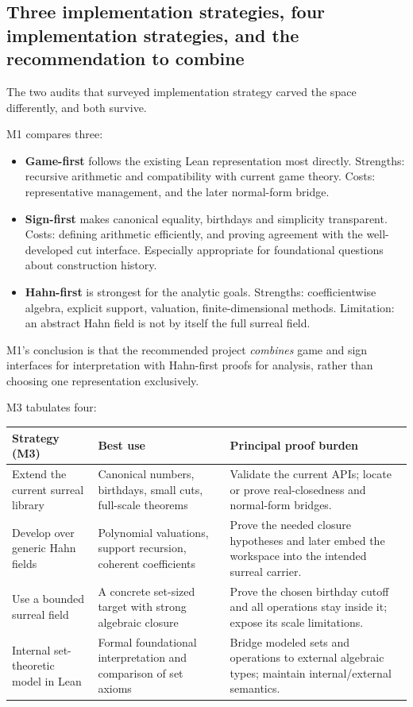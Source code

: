 \documentclass[11pt,letterpaper]{article}
\numberwithin{equation}{section}
\theoremstyle{definition}
\theoremstyle{remark}
\begin{document}
\subsection{Three implementation strategies, four implementation strategies,
and the recommendation to combine}
\label{found:sub:strategies}
The two audits that surveyed implementation strategy carved the space
differently, and both survive.

M1 compares three:
\begin{itemize}
\item \textbf{Game-first} follows the existing Lean representation most
directly. Strengths: recursive arithmetic and compatibility with current game
theory. Costs: representative management, and the later normal-form bridge.
\item \textbf{Sign-first} makes canonical equality, birthdays and simplicity
transparent. Costs: defining arithmetic efficiently, and proving agreement with
the well-developed cut interface. Especially appropriate for foundational
questions about construction history.
\item \textbf{Hahn-first} is strongest for the analytic goals. Strengths:
coefficientwise algebra, explicit support, valuation, finite-dimensional
methods. Limitation: an abstract Hahn field is not by itself the full surreal
field.
\end{itemize}
M1's conclusion is that the recommended project \emph{combines} game and sign
interfaces for interpretation with Hahn-first proofs for analysis, rather than
choosing one representation exclusively.

M3 tabulates four:

\begin{longtable}{@{}P{0.21\textwidth}P{0.34\textwidth}P{0.36\textwidth}@{}}
\toprule
Strategy (M3) & Best use & Principal proof burden\\
\midrule\endhead
Extend the current surreal library & Canonical numbers, birthdays, small cuts, full-scale theorems & Validate the current APIs; locate or prove real-closedness and normal-form bridges.\\[0.55em]
Develop over generic Hahn fields & Polynomial valuations, support recursion, coherent coefficients & Prove the needed closure hypotheses and later embed the workspace into the intended surreal carrier.\\[0.55em]
Use a bounded surreal field & A concrete set-sized target with strong algebraic closure & Prove the chosen birthday cutoff and all operations stay inside it; expose its scale limitations.\\[0.55em]
Internal set-theoretic model in Lean & Formal foundational interpretation and comparison of set axioms & Bridge modeled sets and operations to external algebraic types; maintain internal/external semantics.\\
\bottomrule
\end{longtable}
\end{document}
